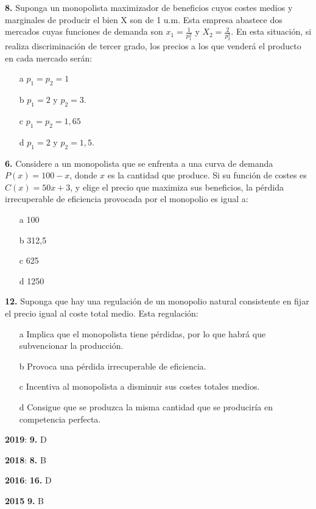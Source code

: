 \documentclass{nuevotema}
\begin{document}
\textbf{8.} Suponga un monopolista maximizador de beneficios cuyos costes medios y marginales de producir el bien X son de 1 u.m. Esta empresa abastece dos mercados cuyas funciones de demanda son $x_1 = \frac{1}{p_1^2}$ y $X_2 = \frac{2}{p_2^3}$. En esta situación, si realiza discriminación de tercer grado, los precios a los que venderá el producto en cada mercado serán:

\begin{itemize}
	\item[a] $p_1 = p_2 = 1$
	\item[b] $p_1 = 2$ y $p_2=3$.
	\item[c] $p_1 = p_2 = 1,65$
	\item[d] $p_1 = 2$ y $p_2=1,5$.
\end{itemize}

\textbf{6.} Considere a un monopolista que se enfrenta a una curva de demanda $P(x) = 100 -x$, donde $x$ es la cantidad que produce. Si su función de costes es $C(x) = 50x + 3$, y elige el precio que maximiza sus beneficios, la pérdida irrecuperable de eficiencia provocada por el monopolio es igual a:
\begin{enumerate}
	\item[a] 100
	\item[b] 312,5
	\item[c] 625
	\item[d] 1250
\end{enumerate}

\textbf{12.} Suponga que hay una regulación de un monopolio natural consistente en fijar el precio igual al coste total medio. Esta regulación:
\begin{enumerate}
	\item[a] Implica que el monopolista tiene pérdidas, por lo que habrá que subvencionar la producción.
	\item[b] Provoca una pérdida irrecuperable de eficiencia.
	\item[c] Incentiva al monopolista a disminuir sus costes totales medios.
	\item[d] Consigue que se produzca la misma cantidad que se produciría en competencia perfecta.
\end{enumerate}

\notas

\textbf{2019}: \textbf{9.} D

\textbf{2018}: \textbf{8.} B

\textbf{2016}: \textbf{16.} D

\textbf{2015} \textbf{9.} B
\end{document}

